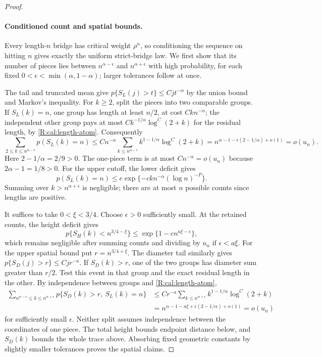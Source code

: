 \begin{proof}
\paragraph{Conditioned count and spatial bounds.}
Every length-$n$ bridge has critical weight $\rho^n$, so conditioning the
sequence on hitting $n$ gives exactly the uniform strict-bridge law.
We first show that its number of pieces lies between
$n^{\alpha-\epsilon}$ and $n^{\alpha+\epsilon}$ with high probability,
for each fixed $0<\epsilon<\min(\alpha,1-\alpha)$; larger tolerances follow at once.

The tail and truncated mean give
$p\{S_L(j)>t\}\le Cj t^{-\alpha}$ by the union bound and Markov's
inequality. For $k\ge2$, split the pieces into two comparable groups.
If $S_L(k)=n$, one group has length at least $n/2$, at cost
$Ck n^{-\alpha}$; the independent other group pays at most
$Ck^{-1/\alpha}\log^C(2+k)$ for the residual length, by
\eqref{R:cal:length-atom}. Consequently
\[
 \sum_{2\le k\le n^{\alpha-\epsilon}}p(S_L(k)=n)
 \le Cn^{-\alpha}\sum_{k\le n^{\alpha-\epsilon}}
           k^{1-1/\alpha}\log^C(2+k)
 =n^{\alpha-1-\epsilon(2-1/\alpha)+o(1)}=o(u_n).
\]
Here $2-1/\alpha=2/9>0$. The one-piece term is at most
$Cn^{-\alpha}=o(u_n)$ because $2\alpha-1=1/8>0$.
For the upper cutoff, the lower deficit gives
\[
 p(S_L(k)=n)\le e\exp\{-c k n^{-\alpha}(\log n)^{-P}\}.
\]
Summing over $k>n^{\alpha+\epsilon}$ is negligible; there are at most $n$
possible counts since lengths are positive.

It suffices to take $0<\xi<3/4$. Choose $\epsilon>0$ sufficiently small. At the retained
counts, the height deficit gives
\[
 p\{S_H(k)<n^{3/4-\xi}\}
 \le\exp\{1-c n^{a\xi-\epsilon}\},
\]
which remains negligible after summing counts and dividing by $u_n$ if
$\epsilon<a\xi$. For the upper spatial bound put $r=n^{3/4+\xi}$.
The diameter tail similarly gives $p\{S_D(j)>r\}\le Cj r^{-a}$.
If $S_D(k)>r$, one of the two groups has diameter sum greater than $r/2$.
Test this event in that group and the exact residual length in the other.
By independence between groups and \eqref{R:cal:length-atom},
\[
 \begin{aligned}
 \sum_{n^{\alpha-\epsilon}\le k\le n^{\alpha+\epsilon}}
       p\{S_D(k)>r,\ S_L(k)=n\}
 &\le Cr^{-a}\sum_{k\le n^{\alpha+\epsilon}}
                  k^{1-1/\alpha}\log^C(2+k)\\
 &=n^{\alpha-1-a\xi+\epsilon(2-1/\alpha)+o(1)}=o(u_n)
 \end{aligned}
\]
for sufficiently small $\epsilon$. Neither split assumes independence
between the coordinates of one piece. The total height bounds endpoint
distance below, and $S_D(k)$ bounds the whole trace above. Absorbing fixed
geometric constants by slightly smaller tolerances proves the spatial
claims.


\end{proof}
